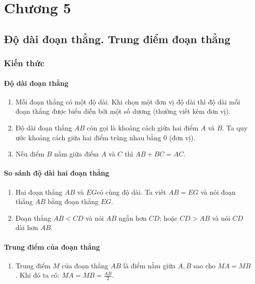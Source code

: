 \def\i{\item}
\graphicspath{{../pictures/vande29/}}
\chapter{Chương 5}
\section{Độ dài đoạn thẳng. Trung điểm đoạn thẳng}
\subsection{Kiến thức} 
\subsubsection{Độ dài đoạn thẳng} 
\begin{enumerate}[--, leftmargin=*]
	\i Mỗi đoạn thẳng có một độ dài. Khi chọn một đơn vị độ dài thì độ dài mỗi đoạn thẳng được biểu diễn bởi một số dương (thường viết kèm đơn vị).
	\i Độ dài đoạn thẳng $AB$ còn gọi là khoảng cách giữa hai điểm $A$ và $B$. Ta quy ước khoảng cách giữa hai điểm trùng nhau bằng 0 (đơn vị).
	\i Nếu điểm $B$ nằm giữa điểm $A$ và $C$ thì $AB+BC=AC$.
	\begin{center}
	\end{center}
\end{enumerate}
\subsubsection{So sánh độ dài hai đoạn thẳng}
\begin{enumerate}[--, leftmargin=*]
	\i Hai đoạn thẳng $AB$ và $EG$có cùng độ dài. Ta viết $AB=EG$ và nói đoạn thẳng $AB$ bằng đoạn thẳng $EG$.
	\i Đoạn thẳng $AB<CD$ và nói $AB$ ngắn hơn $CD$; hoặc $CD>AB$ và nói $CD$ dài hơn $AB$.
\end{enumerate}
\subsubsection{Trung điểm của đoạn thẳng}
\begin{enumerate}[--, leftmargin=*]
	\i Trung điểm $M$ của đoạn thẳng $AB$ là điểm nằm giữa $A,B$ sao cho $MA=MB$. Khi đó ta có: $MA=MB=\frac{AB}{2}$.
\end{enumerate}
